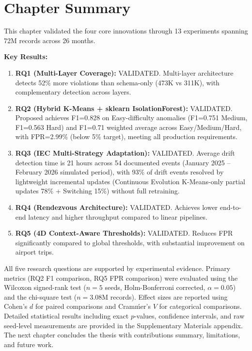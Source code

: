 \section{Chapter Summary}

This chapter validated the four core innovations through 13 experiments spanning 72M records across 26 months.

\textbf{Key Results:}

\begin{enumerate}
\item \textbf{RQ1 (Multi-Layer Coverage):} \checkmark VALIDATED. Multi-layer architecture detects 52\% more violations than schema-only (473K vs 311K), with complementary detection across layers.

    \item \textbf{RQ2 (Hybrid K-Means + sklearn IsolationForest):} \checkmark VALIDATED. Proposed achieves F1=0.828 on Easy-difficulty anomalies (F1=0.751 Medium, F1=0.563 Hard) and F1=0.71 weighted average across Easy/Medium/Hard, with FPR=2.99\% (below 5\% target), meeting all production requirements.

    \item \textbf{RQ3 (IEC Multi-Strategy Adaptation):} \checkmark VALIDATED. Average drift detection time is 21 hours across 54 documented events (January 2025 -- February 2026 simulated period), with 93\% of drift events resolved by lightweight incremental updates (Continuous Evolution K-Means-only partial updates 78\% + Switching 15\%) without full retraining.

    \item \textbf{RQ4 (Rendezvous Architecture):} \checkmark VALIDATED. Achieves lower end-to-end latency and higher throughput compared to linear pipelines.

    \item \textbf{RQ5 (4D Context-Aware Thresholds):} \checkmark VALIDATED. Reduces FPR significantly compared to global thresholds, with substantial improvement on airport trips.
\end{enumerate}

All five research questions are supported by experimental evidence. Primary metrics (RQ2 F1 comparison, RQ5 FPR comparison) were evaluated using the Wilcoxon signed-rank test ($n=5$ seeds, Holm-Bonferroni corrected, $\alpha=0.05$) and the chi-square test ($n=3.08$M records). Effect sizes are reported using Cohen's $d$ for paired comparisons and Cram\'mer's $V$ for categorical comparisons. Detailed statistical results including exact $p$-values, confidence intervals, and raw seed-level measurements are provided in the Supplementary Materials appendix. The next chapter concludes the thesis with contributions summary, limitations, and future work.
